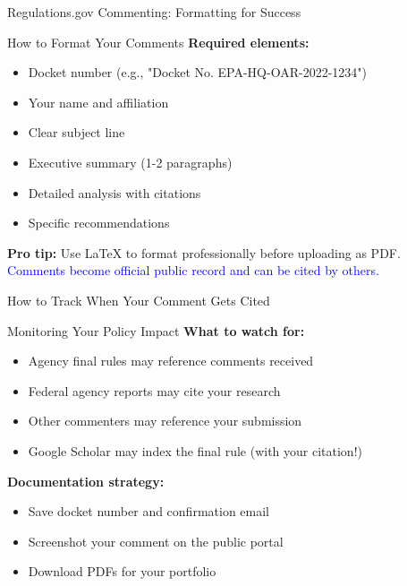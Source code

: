 \documentclass[11pt]{beamer}
\begin{document}
	\begin{frame}{Regulations.gov Commenting: Formatting for Success}
		\small
		\begin{block}{How to Format Your Comments}
			\textbf{Required elements:}
			\begin{itemize}
				\item Docket number (e.g., "Docket No. EPA-HQ-OAR-2022-1234")
				\item Your name and affiliation
				\item Clear subject line
				\item Executive summary (1-2 paragraphs)
				\item Detailed analysis with citations
				\item Specific recommendations
			\end{itemize}
			\textbf{Pro tip:} Use LaTeX to format professionally before uploading as PDF.
			\textcolor{blue}{Comments become official public record and can be cited by others.}
		\end{block}
	\end{frame}
	
	\begin{frame}{How to Track When Your Comment Gets Cited}
		\small
		\begin{block}{Monitoring Your Policy Impact}
			\textbf{What to watch for:}
			\begin{itemize}
				\item Agency final rules may reference comments received
				\item Federal agency reports may cite your research
				\item Other commenters may reference your submission
				\item Google Scholar may index the final rule (with your citation!)
			\end{itemize}
			\textbf{Documentation strategy:}
			\begin{itemize}
				\item Save docket number and confirmation email
				\item Screenshot your comment on the public portal
				\item Download PDFs for your portfolio
			\end{itemize}
		\end{block}
	\end{frame}
	
\end{document}
